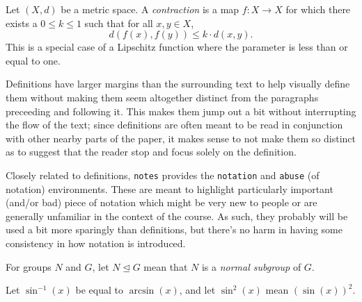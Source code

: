 \documentclass{notes}
\begin{document}
	\begin{definition}[Contraction]
		Let $(X,d)$ be a metric space. A \emph{contraction} is a map $f : X \to X$ for which there exists a $0 \leq k \leq 1$ such that for all $x,y \in X$,
		\[ d(f(x), f(y)) \leq k\cdot d(x,y). \]
		This is a special case of a Lipschitz function where the parameter is less than or equal to one.
	\end{definition}
	Definitions have larger margins than the surrounding text to help visually define them without making them seem altogether distinct from the paragraphs preceeding and following it.
	This makes them jump out a bit without interrupting the flow of the text; since definitions are often meant to be read in conjunction with other nearby parts of the paper, it makes sense to not make them so distinct as to suggest that the reader stop and focus solely on the definition.

	Closely related to definitions, \texttt{notes} provides the \texttt{notation} and \texttt{abuse} (of notation) environments.
	These are meant to highlight particularly important (and/or bad) piece of notation which might be very new to people or are generally unfamiliar in the context of the course.
	As such, they probably will be used a bit more sparingly than definitions, but there's no harm in having some consistency in how notation is introduced.
	\begin{notation}
		For groups $N$ and $G$, let $N \trianglelefteq G$ mean that $N$ is a \emph{normal subgroup} of $G$.
	\end{notation}
	\begin{abuse}
		Let $\sin^{-1}(x)$ be equal to $\arcsin(x)$, and let $\sin^2(x)$ mean $(\sin(x))^2$. 
	\end{abuse}
\end{document}
